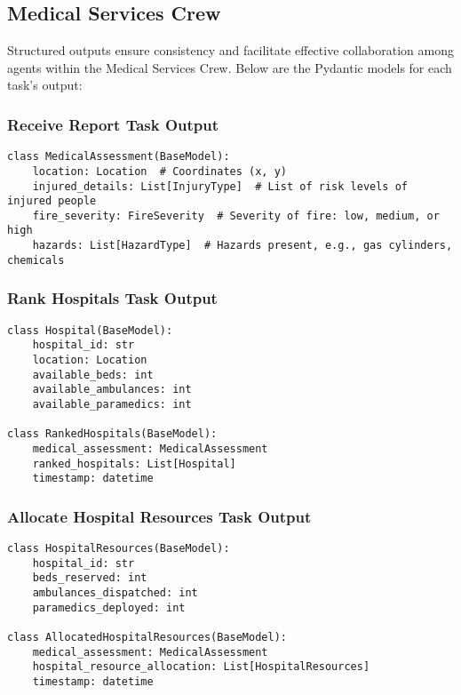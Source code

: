 \subsection{Medical Services Crew}

Structured outputs ensure consistency and facilitate effective collaboration among agents within the Medical Services Crew. Below are the Pydantic models for each task's output:

\subsubsection{Receive Report Task Output}
\begin{lstlisting}[caption={Pydantic model for Receive Report Task Output}]
class MedicalAssessment(BaseModel):
    location: Location  # Coordinates (x, y)
    injured_details: List[InjuryType]  # List of risk levels of injured people
    fire_severity: FireSeverity  # Severity of fire: low, medium, or high
    hazards: List[HazardType]  # Hazards present, e.g., gas cylinders, chemicals
\end{lstlisting}

\subsubsection{Rank Hospitals Task Output}
\begin{lstlisting}[caption={Pydantic model for Rank Hospitals Task Output}]
class Hospital(BaseModel):
    hospital_id: str
    location: Location
    available_beds: int
    available_ambulances: int
    available_paramedics: int

class RankedHospitals(BaseModel):
    medical_assessment: MedicalAssessment
    ranked_hospitals: List[Hospital]
    timestamp: datetime
\end{lstlisting}

\subsubsection{Allocate Hospital Resources Task Output}
\begin{lstlisting}[caption={Pydantic model for Allocate Hospital Resources Task Output}]
class HospitalResources(BaseModel):
    hospital_id: str
    beds_reserved: int
    ambulances_dispatched: int
    paramedics_deployed: int

class AllocatedHospitalResources(BaseModel):
    medical_assessment: MedicalAssessment
    hospital_resource_allocation: List[HospitalResources]
    timestamp: datetime
\end{lstlisting}

